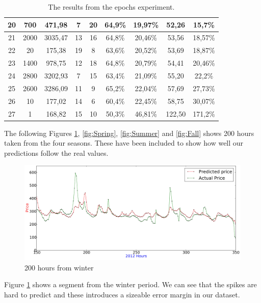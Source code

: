 \begin{table}[H]
{\begin{tabular}{|c|c|c|c|c|c|c|c|c|}
	20 & 700  & 471,98 & 7  & 20 & 64,9\% & 19,97\% & 52,26 & 15,7\% \\ \hline
	21 & 2000 & 3035,47 & 13 & 16 & 64,8\% & 20,46\% & 53,56 & 18,57\% \\ \hline
	22 & 20   & 175,38 & 19 & 8  & 63,6\% & 20,52\% & 53,69 & 18,87\% \\ \hline
	23 & 1400 & 978,75 & 12 & 18 & 64,8\% & 20,79\% & 54,41 & 20,46\% \\ \hline
	24 & 2800 & 3202,93 & 7  & 15 & 63,4\% & 21,09\% & 55,20 & 22,2\% \\ \hline
	25 & 2600 & 3286,09 & 11 & 9  & 65,2\% & 22,04\% & 57,69 & 27,73\% \\ \hline
	26 & 10   & 177,02 & 14 & 6  & 60,4\% & 22,45\% & 58,75 & 30,07\% \\ \hline
	27 & 1    & 168,82 & 15 & 10 & 50,3\% & 46,81\% & 122,50 & 171,2\% \\ \hline
	\end{tabular}
}
\caption{The results from the epochs experiment.} %
\label{table:Epochs} %
\end{table}

The following Figures \ref{fig:Winter}, \ref{fig:Spring}, \ref{fig:Summer} and \ref{fig:Fall} shows 200 hours taken from the four seasons. These have been included to show how well our predictions follow the real values.
\begin{figure}[H]
\centering
\includegraphics[width=\linewidth]{billeder/PriceExperimentalAnalysis/winter.jpg}
\caption{200 hours from winter}
\label{fig:Winter}
\end{figure}

Figure \ref{fig:Winter} shows a segment from the winter period. We can see that the spikes are hard to predict and these introduces a sizeable error margin in our dataset.

